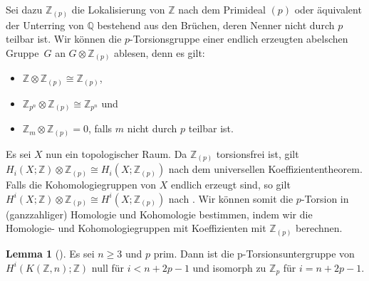 \documentclass[11pt, a4paper, german]{article}
\theoremstyle{definition}
\newtheorem{lem}{Lemma}
\theoremstyle{remark}
\newcommand{\Z}{\mathbb{Z}} %
\newcommand{\Q}{\mathbb{Q}} %
\begin{document}
Sei dazu $\Z_{(p)}$ die Lokalisierung von $\Z$ nach dem Primideal $(p)$ oder äquivalent der Unterring von $\Q$ bestehend aus den Brüchen, deren Nenner nicht durch $p$ teilbar ist.
Wir können die $p$-Torsionsgruppe einer endlich erzeugten abelschen Gruppe~$G$ an $G \otimes \Z_{(p)}$ ablesen, denn es gilt:
\begin{itemize}
  \item $\Z \otimes \Z_{(p)} \cong \Z_{(p)}$,
  \item $\Z_{p^n} \otimes \Z_{(p)} \cong \Z_{p^n}$ und
  \item $\Z_m \otimes \Z_{(p)} = 0$, falls $m$ nicht durch $p$ teilbar ist.
\end{itemize}

Es sei $X$ nun ein topologischer Raum.
Da $\Z_{(p)}$ torsionsfrei ist, gilt
$H_i(X; \Z) \otimes \Z_{(p)} \cong H_i(X; \Z_{(p)})$ nach dem universellen Koeffiziententheorem.
Falls die Kohomologiegruppen von $X$ endlich erzeugt sind, so gilt
$H^i(X; \Z) \otimes \Z_{(p)} \cong H^i(X; \Z_{(p)})$
nach \cite[Thm 5.5.10]{spanier:at}.
Wir können somit die $p$-Torsion in (ganzzahliger) Homologie und Kohomologie bestimmen, indem wir die Homologie- und Kohomologiegruppen mit Koeffizienten mit $\Z_{(p)}$ berechnen.

\begin{lem}[{\cite[Lem 1.29]{hatcher:ss}}]\label{mod-p-cohomology-kzn}
  Es sei $n \geq 3$ und $p$ prim.
  Dann ist die p-Torsionsuntergruppe von $H^i(K(\Z, n); \Z)$ null für $i < n + 2p - 1$ und isomorph zu $\Z_p$ für $i = n + 2p - 1$.
\end{lem}
\end{document}
